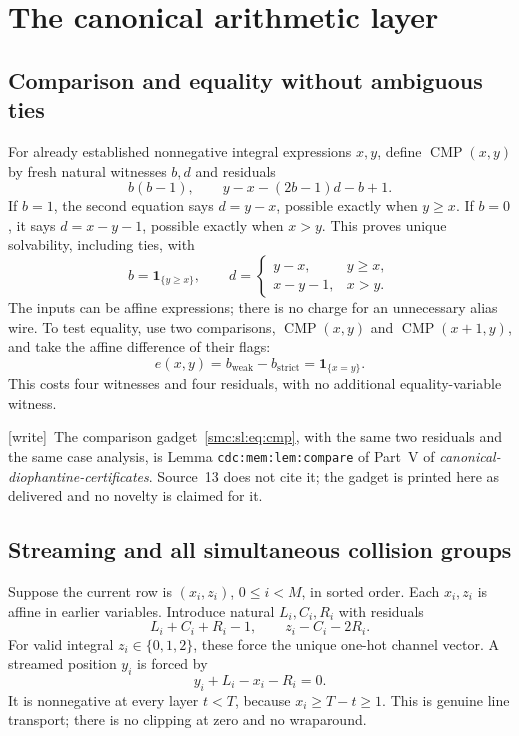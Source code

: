 \documentclass[11pt,letterpaper]{article}
\numberwithin{equation}{section}
\theoremstyle{definition}
\theoremstyle{remark}
\newcommand{\wtag}{\textup{[write]}}
\newcommand{\ind}[1]{\mathbf 1_{\{#1\}}}
\newcommand{\CMP}{\operatorname{CMP}}
\begin{document}
\section{The canonical arithmetic layer}\label{smc:sl:sec:arithmetic}
\subsection{Comparison and equality without ambiguous ties}
For already established nonnegative integral expressions $x,y$, define $\CMP(x,y)$ by fresh natural witnesses $b,d$ and residuals
\begin{equation}\label{smc:sl:eq:cmp}
 b(b-1),\qquad y-x-(2b-1)d-b+1.
\end{equation}
If $b=1$, the second equation says $d=y-x$, possible exactly when $y\ge x$. If $b=0$, it says $d=x-y-1$, possible exactly when $x>y$. This proves unique solvability, including ties, with
\[
 b=\ind{y\ge x},\qquad
 d=\begin{cases}y-x,&y\ge x,\\x-y-1,&x>y.\end{cases}
\]
The inputs can be affine expressions; there is no charge for an unnecessary alias wire. To test equality, use two comparisons, $\CMP(x,y)$ and $\CMP(x+1,y)$, and take the affine difference of their flags:
\begin{equation}\label{smc:sl:eq:eq}
 e(x,y)=b_{\mathrm{weak}}-b_{\mathrm{strict}}=\ind{x=y}.
\end{equation}
This costs four witnesses and four residuals, with no additional equality-variable witness.

\wtag\ The comparison gadget~\eqref{smc:sl:eq:cmp}, with the same two residuals and the same case analysis, is Lemma \texttt{cdc:mem:lem:compare} of Part~V of \emph{canonical-diophantine-certificates}. Source~13 does not cite it; the gadget is printed here as delivered and no novelty is claimed for it.

\subsection{Streaming and all simultaneous collision groups}
Suppose the current row is $(x_i,z_i)$, $0\le i<M$, in sorted order. Each $x_i,z_i$ is affine in earlier variables. Introduce natural $L_i,C_i,R_i$ with residuals
\begin{equation}\label{smc:sl:eq:channel}
 L_i+C_i+R_i-1,\qquad z_i-C_i-2R_i.
\end{equation}
For valid integral $z_i\in\{0,1,2\}$, these force the unique one-hot channel vector. A streamed position $y_i$ is forced by
\begin{equation}\label{smc:sl:eq:stream}
 y_i+L_i-x_i-R_i=0.
\end{equation}
It is nonnegative at every layer $t<T$, because $x_i\ge T-t\ge1$. This is genuine line transport; there is no clipping at zero and no wraparound.
\end{document}

